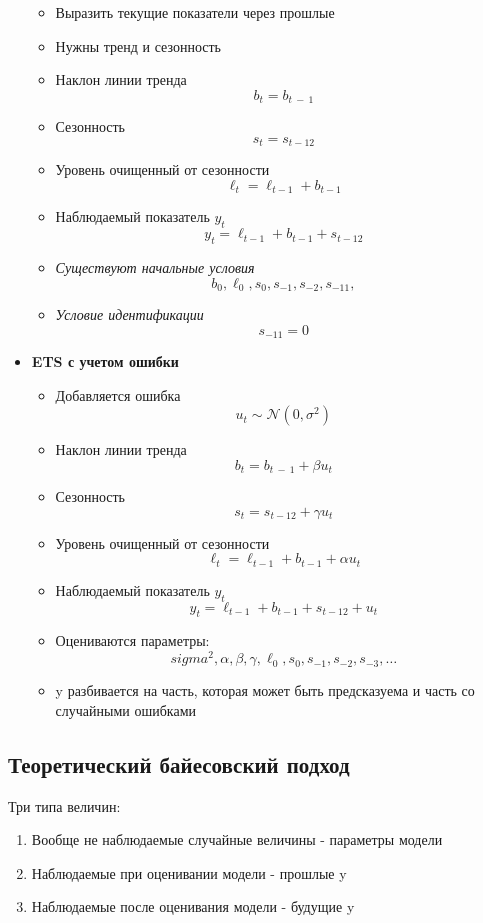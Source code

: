 \documentclass[a4paper, 12pt]{article}
\begin{document}
\begin{itemize}
\begin{itemize}
  \item Выразить текущие показатели через прошлые
  \item Нужны тренд и сезонность
  \item {Наклон линии тренда}
    \[b_{t} = b_{t\  - \ 1}\]
     \item Сезонность
     \[s_{t} = s_{t - 12}\]
     \item Уровень очищенный от сезонности
     \[\ell_{t} = \ell_{t - 1} + b_{t - 1}\]
    \item Наблюдаемый показатель $y_{t}$
    \[y_{t} = \ell_{t - 1} + b_{t - 1} + s_{t - 12}\]
    \item \textit{Существуют начальные условия}
    \[b_{0}, \ell_{0}, s_{0}, s_{-1}, s_{-2}, s_{-11},\]
    \item \textit{Условие идентификации}
    \[s_{-11} = 0\]
  \end{itemize}
  \item \textbf{ETS с учетом ошибки}
  \begin{itemize}
      \item Добавляется ошибка
      \[u_t \sim \mathcal{N}(0, \sigma^2)\]
      \item {Наклон линии тренда}
      \[b_{t} = b_{t\  - \ 1} + \beta u_t\]
      \item Сезонность
      \[s_{t} = s_{t - 12} + \gamma u_t\]
      \item Уровень очищенный от сезонности
      \[\ell_{t} = \ell_{t - 1} + b_{t - 1} + \alpha u_t\]
      \item Наблюдаемый показатель $y_{t}$
      \[y_{t} = \ell_{t - 1} + b_{t - 1} + s_{t - 12} + u_t\]
      \item Оцениваются параметры:
      \[sigma^2, \alpha, \beta, \gamma, \ell_0, s_0, s_{-1}, s_{-2}, s_{-3}, \ldots\]
      \item y разбивается на часть, которая может быть предсказуема и часть со случайными ошибками
  \end{itemize}
\end{itemize}

\subsection{Теоретический байесовский подход}

Три типа величин:

\begin{enumerate}
    \item Вообще не наблюдаемые случайные величины - параметры модели
    \item Наблюдаемые при оценивании модели - прошлые y
    \item Наблюдаемые после оценивания модели - будущие y
\end{enumerate}
\end{document}
